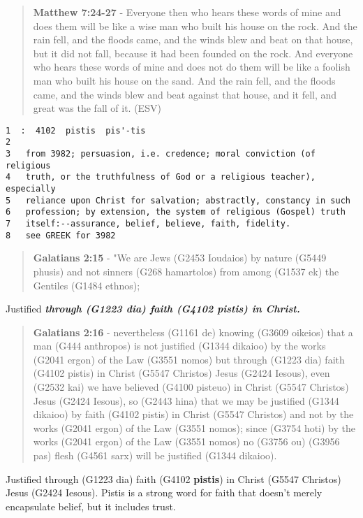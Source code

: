 \documentclass[11pt]{article}
\begin{document}
\begin{quote}
\textbf{Matthew 7:24-27} - Everyone then who hears these words of mine and does them will be like a wise man who built his house on the rock. And the rain fell, and the floods came, and the winds blew and beat on that house, but it did not fall, because it had been founded on the rock. And everyone who hears these words of mine and does not do them will be like a foolish man who built his house on the sand. And the rain fell, and the floods came, and the winds blew and beat against that house, and it fell, and great was the fall of it. (ESV)
\end{quote}

\begin{verbatim}
1  :  4102  pistis  pis'-tis
2  
3   from 3982; persuasion, i.e. credence; moral conviction (of religious
4   truth, or the truthfulness of God or a religious teacher), especially
5   reliance upon Christ for salvation; abstractly, constancy in such
6   profession; by extension, the system of religious (Gospel) truth
7   itself:--assurance, belief, believe, faith, fidelity.
8   see GREEK for 3982
\end{verbatim}

\begin{quote}
\textbf{Galatians 2:15} - "We are Jews (G2453 Ioudaios) by nature (G5449 phusis) and not sinners (G268 hamartolos) from among (G1537 ek) the Gentiles (G1484 ethnos);
\end{quote}

Justified \emph{\textbf{through (G1223 dia) faith (G4102 pistis) in Christ.}}

\begin{quote}
\textbf{Galatians 2:16} - nevertheless (G1161 de) knowing (G3609 oikeios) that a man (G444 anthropos) is not justified (G1344 dikaioo) by the works (G2041 ergon) of the Law (G3551 nomos) but through (G1223 dia) faith (G4102 pistis) in Christ (G5547 Christos) Jesus (G2424 Iesous), even (G2532 kai) we have believed (G4100 pisteuo) in Christ (G5547 Christos) Jesus (G2424 Iesous), so (G2443 hina) that we may be justified (G1344 dikaioo) by faith (G4102 pistis) in Christ (G5547 Christos) and not by the works (G2041 ergon) of the Law (G3551 nomos); since (G3754 hoti) by the works (G2041 ergon) of the Law (G3551 nomos) no (G3756 ou) (G3956 pas) flesh (G4561 sarx) will be justified (G1344 dikaioo).
\end{quote}

Justified through (G1223 dia) faith (G4102 \textbf{pistis}) in Christ (G5547 Christos) Jesus (G2424 Iesous).
Pistis is a strong word for faith that doesn't merely encapsulate belief, but it includes trust.
\end{document}
